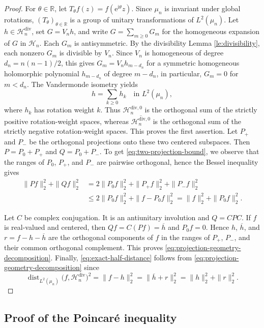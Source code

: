\documentclass[11pt,reqno]{amsart}
\numberwithin{equation}{section}%
\numberwithin{figure}{section}%
\numberwithin{table}{section}
\theoremstyle{plain}
\theoremstyle{definition}
\begin{document}
\begin{proof}
  For $\theta\in\mathbb{R}$, let
  $T_\theta f(z)=f(\mathrm{e}^{\mathrm{i}\theta}z)$. Since $\mu_n$ is
  invariant under global rotations, ${(T_\theta)}_{\theta\in\mathbb{R}}$ is a
  group of unitary transformations of $L^2(\mu_n)$. Let
  $h\in\mathcal{H}_n^{\mathrm{div}}$, set $G=V_nh$, and write
  $G=\sum_{m\geq0}G_m$ for the homogeneous expansion of $G$ in
  $\mathcal{H}_n$. Each $G_m$ is antisymmetric. By the divisibility Lemma
  \ref{le:divisibility}, each nonzero $G_m$ is divisible by $V_n$. Since $V_n$
  is homogeneous of degree $d_n=n(n-1)/2$, this gives $G_m=V_nh_{m-d_n}$ for a
  symmetric homogeneous holomorphic polynomial $h_{m-d_n}$ of degree $m-d_n$,
  in particular, $G_m=0$ for $m<d_n$. The Vandermonde isometry yields
  \[
    h=\sum_{k\geq0}h_k
    \quad\text{in }L^2(\mu_n),
  \]
  where $h_k$ has rotation weight $k$. Thus $\mathcal{H}_n^{\mathrm{div},0}$
  is the orthogonal sum of the strictly positive rotation-weight spaces,
  whereas $\overline{\mathcal{H}_n^{\mathrm{div},0}}$ is the orthogonal sum of
  the strictly negative rotation-weight spaces. This proves the first
  assertion. Let $P_+$ and $P_-$ be the orthogonal projections onto these two
  centered subspaces. Then $P=P_0+P_+$ and $Q=P_0+P_-$. To get
  \eqref{eq:two-projection-bound}, we observe that the ranges of $P_0$, $P_+$,
  and $P_-$ are pairwise orthogonal, hence the Bessel inequality gives
  \begin{align*}
    \|Pf\|_2^2+\|Qf\|_2^2
    &=2\|P_0f\|_2^2+\|P_+f\|_2^2+\|P_-f\|_2^2\\
    &\leq2\|P_0f\|_2^2+\|f-P_0f\|_2^2
      =\|f\|_2^2+\|P_0f\|_2^2.
  \end{align*}

  Let $C$ be complex conjugation. It is an antiunitary involution and $Q=CPC$.
  If $f$ is real-valued and centered, then $Qf=C(Pf)=\overline h$ and
  $P_0f=0$. Hence $h$, $\overline h$, and $r=f-h-\overline h$ are the
  orthogonal components of $f$ in the ranges of $P_+$, $P_-$, and their common
  orthogonal complement. This proves
  \eqref{eq:projection-geometry-decomposition}. Finally,
  \eqref{eq:exact-half-distance} follows from
  \eqref{eq:projection-geometry-decomposition} since
  \[
    \operatorname{dist}_{L^2(\mu_n)}
    \bigl(f,\mathcal{H}_n^{\mathrm{div}}\bigr)^2
    =\|f-h\|_2^2
    =\|\overline h+r\|_2^2
    =\|h\|_2^2+\|r\|_2^2.
  \]
\end{proof}


\subsection{Proof of the Poincaré inequality}
\label{ss:proof:poincare}
\end{document}
